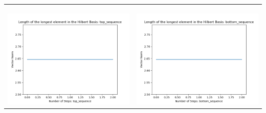 \documentclass[10pt]{article}
\begin{document}
\begin{tabular}{c|c}
\begin{minipage}{.45\textwidth}
\end{minipage} \\ \\
\hline \\\begin{minipage}{.45\textwidth}
\includegraphics[width=\textwidth]{"DATA/5d/5 generators 1 bound F/top_sequence LENGTH"}
\end{minipage} &
\begin{minipage}{.45\textwidth}
\includegraphics[width=\textwidth]{"DATA/5d/5 generators 1 bound F bottomup/bottom_sequence LENGTH"}
\end{minipage}
\end{tabular}
\end{document}

